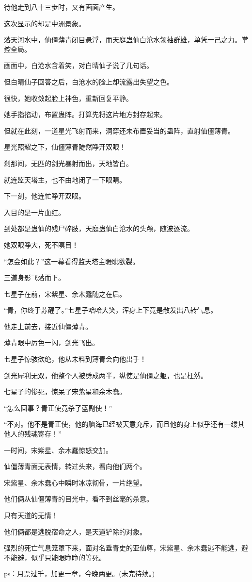 \begin{this_body}
待他走到八十三步时，又有画面产生。

这次显示的却是中洲景象。

落天河水中，仙僵薄青闭目悬浮，而天庭蛊仙白沧水领袖群雄，单凭一己之力。掌控全局。

画面中，白沧水含着笑，对白晴仙子说了几句话。

但白晴仙子回答之后，白沧水的脸上却流露出失望之色。

很快，她收敛起脸上神色，重新回复平静。

她手指掐动，布置蛊阵。打算先将这片地方封存起来。

但就在此刻，一道星光飞射而来，洞穿还未布置妥当的蛊阵，直射仙僵薄青。

星光照耀之下，仙僵薄青陡然睁开双眼！

刹那间，无匹的剑光暴射而出，天地皆白。

就连监天塔主，也不由地闭了一下眼睛。

下一刻，他连忙睁开双眼。

入目的是一片血红。

到处都是蛊仙的残尸碎肢，天庭蛊仙白沧水的头颅，随波逐流。

她双眼睁大，死不瞑目！

“怎会如此？”这一幕看得监天塔主睚眦欲裂。

三道身影飞落而下。

七星子在前，宋紫星、余木蠢随之在后。

“青，你终于苏醒了。”七星子哈哈大笑，浑身上下竟是散发出八转气息。

他走上前去，接近仙僵薄青。

薄青眼中厉色一闪，剑光飞出。

七星子惊骇欲绝，他从未料到薄青会向他出手！

剑光犀利无双，他整个人被劈成两半，纵使是仙僵之躯，也是枉然。

七星子的惨死，惊呆了宋紫星和余木蠢。

“怎么回事？青正使竟杀了蓝副使！”

“不对。他不是青正使，他的脑海已经被天意充斥，而且他的身上似乎还有一缕其他人的残魂寄存！”

一时间，宋紫星、余木蠢惊怒交加。

仙僵薄青面无表情，转过头来，看向他们两个。

宋紫星、余木蠢心中瞬时冰凉彻骨，一片绝望。

他们俩从仙僵薄青的目光中，看不到丝毫的杀意。

只有天道的无情！

他们俩都是逃脱宿命之人，是天道铲除的对象。

强烈的死亡气息笼罩下来，面对名垂青史的亚仙尊，宋紫星、余木蠢逃不能逃，避不能避，似乎只能眼睁睁的等死。

ps：月票过千，加更一章，今晚两更。(未完待续。)

\end{this_body}

